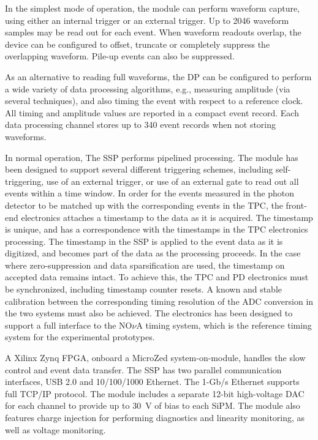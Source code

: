 In the simplest mode of operation, the module can perform waveform
capture, using either an internal trigger or an external trigger.  Up
to 2046 waveform samples may be read out for each event.  When
waveform readouts overlap, the device can be configured to offset,
truncate or completely suppress the overlapping waveform.  Pile-up
events can also be suppressed.

As an alternative to reading full waveforms, the DP can be configured
to perform a wide variety of data processing algorithms, e.g.,
measuring amplitude (via several techniques), and also timing the event
with respect to a reference clock.  All timing and amplitude values
are reported in a compact event record.  Each data processing channel
stores up to 340 event records when not storing waveforms.

In normal operation, The SSP performs pipelined processing.  The
module has been designed to support several different triggering
schemes, including self-triggering, use of an external trigger, or use
of an external gate to read out all events within a time window.  In
order for the events measured in the photon detector to be matched up
with the corresponding events in the TPC, the front-end electronics
attaches a timestamp to the data as it is acquired.  The timestamp is
unique, and has a correspondence with the timestamps in the TPC
electronics processing.  The timestamp in the SSP is applied to the
event data as it is digitized, and becomes part of the data as the
processing proceeds.  In the case where zero-suppression and data
sparsification are used, the timestamp on accepted data remains
intact.  To achieve this, the TPC and PD electronics must be
synchronized, including timestamp counter resets. A known and
stable calibration between the corresponding timing resolution of the
ADC conversion in the two systems must also be achieved.  The
electronics has been designed to support a full interface to the
NO$\nu$A timing system, which is the reference timing system
for the experimental prototypes.

A Xilinx Zynq FPGA, onboard a MicroZed system-on-module, handles the
slow control and event data transfer.  The SSP has two parallel
communication interfaces, USB 2.0 and 10/100/1000 Ethernet.  The
1-Gb/s Ethernet supports full TCP/IP protocol.  The module includes a
separate 12-bit high-voltage DAC for each channel to provide up to
30~V of bias to each SiPM.  The module also features charge injection
for performing diagnostics and linearity monitoring, as well as voltage
monitoring. 

